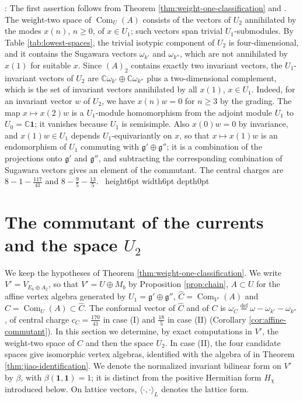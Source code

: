 \documentclass[leqno]{article}
\newcommand{\Cbb}{\ensuremath{\mathbb{C}}}
\renewcommand{\geq}{\ensuremath{\geqslant}}
\newcommand{\qed}{\hfill \vrule height6pt  width6pt depth0pt}
\newcommand{\ov}{\overset}
\newenvironment{proof}[1][]{\noindent {\it Proof #1} : }{\hbox{~}\qed
\smallskip
}
\numberwithin{equation}{section}
\begin{document}
\begin{proof}
The first assertion follows from Theorem \ref{thm:weight-one-classification} and \cite[Theorem 3.1 p.~4]{DoM06}. The weight-two space of $\operatorname{Com}_U(A)$ consists of the vectors of $U_2$ annihilated by the modes $x(n)$, $n \geq 0$, of $x \in U_1$; such vectors span trivial $U_1$-submodules. By Table \ref{tab:lowest-spaces}, the trivial isotypic component of $U_2$ is four-dimensional, and it contains the Sugawara vectors $\omega_{k'}$ and $\omega_{k''}$, which are not annihilated by $x(1)$ for suitable $x$. Since $(A)_2$ contains exactly two invariant vectors, the $U_1$-invariant vectors of $U_2$ are $\Cbb\omega_{k'} \oplus \Cbb\omega_{k''}$ plus a two-dimensional complement, which is the set of invariant vectors annihilated by all $x(1)$, $x \in U_1$. Indeed, for an invariant vector $w$ of $U_2$, we have $x(n)w = 0$ for $n \geq 3$ by the grading. The map $x \mapsto x(2)w$ is a $U_1$-module homomorphism from the adjoint module $U_1$ to $U_0 = \Cbb\mathbf 1$; it vanishes because $U_1$ is semisimple. Also $x(0)w = 0$ by invariance, and $x(1)w \in U_1$ depends $U_1$-equivariantly on $x$, so that $x \mapsto x(1)w$ is an endomorphism of $U_1$ commuting with $\mathfrak g' \oplus \mathfrak g''$; it is a combination of the projections onto $\mathfrak g'$ and $\mathfrak g''$, and subtracting the corresponding combination of Sugawara vectors gives an element of the commutant. The central charges are $8-1-\frac{117}{41}$ and $8-\frac95-\frac{13}{5}$.
\end{proof}

\section{The commutant of the currents and the space \texorpdfstring{$U_2$}{U2}}
\label{sec:griess}

We keep the hypotheses of Theorem \ref{thm:weight-one-classification}. We write $V' = V_{E_6 \oplus A_2}$, so that $V' = U \oplus M_b$ by Proposition \ref{prop:chain}, $A \subset U$ for the affine vertex algebra generated by $U_1 = \mathfrak g' \oplus \mathfrak g''$, $\widehat C = \operatorname{Com}_{V'}(A)$ and $C = \operatorname{Com}_U(A) \subset \widehat C$. The conformal vector of $\widehat C$ and of $C$ is $\omega_C \ov{\mathrm{def}}{=} \omega-\omega_{k'}-\omega_{k''}$, of central charge $c_C = \frac{170}{41}$ in case (I) and $\frac{18}{5}$ in case (II) (Corollary \ref{cor:affine-commutant}). In this section we determine, by exact computations in $V'$, the weight-two space of $C$ and then the space $U_2$. In case (II), the four candidate spaces give isomorphic vertex algebras, identified with the algebra of \cite{Jia26} in Theorem \ref{thm:jiao-identification}. We denote the normalized invariant bilinear form on $V'$ by $\beta$, with $\beta(\mathbf 1,\mathbf 1) = 1$; it is distinct from the positive Hermitian form $H_\chi$ introduced below. On lattice vectors, $\langle\cdot,\cdot\rangle_L$ denotes the lattice form.
\end{document}
